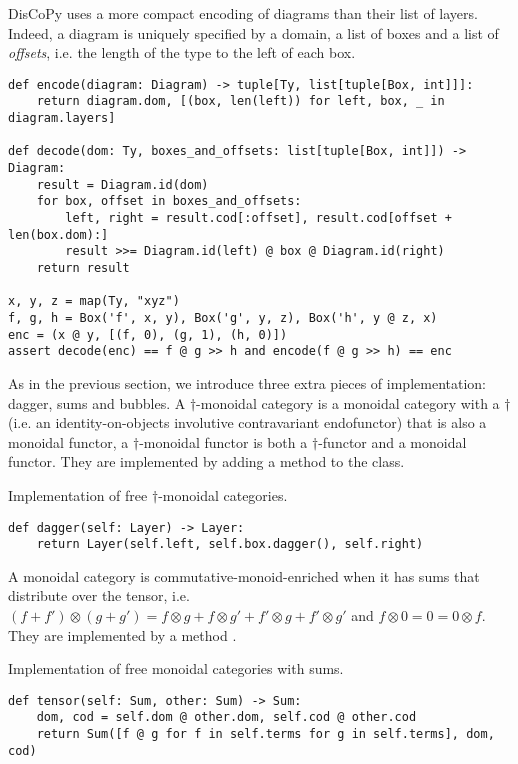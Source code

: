 \begin{remark}
DisCoPy uses a more compact encoding of diagrams than their list of layers.
Indeed, a diagram is uniquely specified by a domain, a list of boxes and a list of \emph{offsets}, i.e. the length of the type to the left of each box.

\begin{verbatim}
def encode(diagram: Diagram) -> tuple[Ty, list[tuple[Box, int]]]:
    return diagram.dom, [(box, len(left)) for left, box, _ in diagram.layers]

def decode(dom: Ty, boxes_and_offsets: list[tuple[Box, int]]) -> Diagram:
    result = Diagram.id(dom)
    for box, offset in boxes_and_offsets:
        left, right = result.cod[:offset], result.cod[offset + len(box.dom):]
        result >>= Diagram.id(left) @ box @ Diagram.id(right)
    return result

x, y, z = map(Ty, "xyz")
f, g, h = Box('f', x, y), Box('g', y, z), Box('h', y @ z, x)
enc = (x @ y, [(f, 0), (g, 1), (h, 0)])
assert decode(enc) == f @ g >> h and encode(f @ g >> h) == enc
\end{verbatim}
\end{remark}

As in the previous section, we introduce three extra pieces of implementation: dagger, sums and bubbles.
A $\dagger$-monoidal category is a monoidal category with a $\dagger$ (i.e. an identity-on-objects involutive contravariant endofunctor) that is also a monoidal functor, a $\dagger$-monoidal functor is both a $\dagger$-functor and a monoidal functor.
They are implemented by adding a  method to the  class.

\begin{python}
{\normalfont Implementation of free $\dagger$-monoidal categories.}

\begin{verbatim}
def dagger(self: Layer) -> Layer:
    return Layer(self.left, self.box.dagger(), self.right)
\end{verbatim}
\end{python}

A monoidal category is commutative-monoid-enriched when it has sums that distribute over the tensor, i.e. $(f + f') \otimes (g + g') = f \otimes g + f \otimes g' + f' \otimes g + f' \otimes g'$
and $f \otimes 0 = 0 = 0 \otimes f$.
They are implemented by a method .

\begin{python}
{\normalfont Implementation of free monoidal categories with sums.}

\begin{verbatim}
def tensor(self: Sum, other: Sum) -> Sum:
    dom, cod = self.dom @ other.dom, self.cod @ other.cod
    return Sum([f @ g for f in self.terms for g in self.terms], dom, cod)
\end{verbatim}
\end{python}

